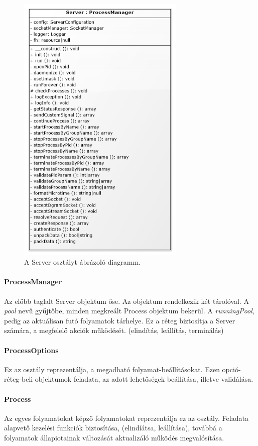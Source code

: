 \documentclass[12pt]{report}
\begin{document}
    \begin{figure}[ht]
       \centering
         \includegraphics[width=8cm]{pics/serv.png}
	  \caption{A Server osztályt ábrázoló diagramm.}
  \end{figure}
  
  \paragraph{ProcessManager}
  Az előbb taglalt Server objektum őse. Az objektum rendelkezik két tárolóval. A \textit{pool} nevű gyűjtőbe, minden megkreált Process objektum bekerül. A \textit{runningPool}, pedig az aktuálisan futó folyamatok tárhelye. Ez a réteg biztosítja a Server számára, a megfelelő akciók működését. (elindítás, leállítás, terminálás)
  \paragraph{ProcessOptions}
  Ez az osztály reprezentálja, a megadható folyamat-beállításokat. Ezen opció-réteg-beli objektumok feladata, az adott lehetőségek beállítása, illetve validálása.
  \paragraph{Process}
  Az egyes folyamatokat képző folyamatokat reprezentálja ez az osztály. Feladata alapvető kezelési funkciók biztosítása, (elindíátsa, leállítása), továbbá a folyamatok állapiotainak változását aktualizáló működés megvalósítása.
  
\end{document}
